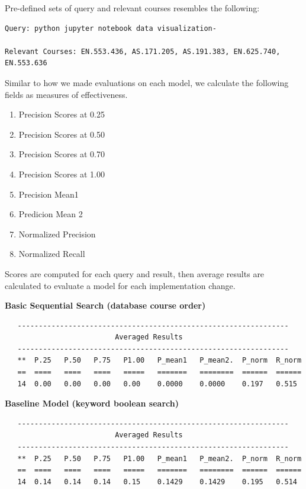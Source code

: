 \documentclass[twoside]{article}
\begin{document}
Pre-defined sets of query and relevant courses resembles the following:

\begin{verbatim}
Query: python jupyter notebook data visualization-

Relevant Courses: EN.553.436, AS.171.205, AS.191.383, EN.625.740, EN.553.636
\end{verbatim}

Similar to how we made evaluations on each model, we calculate the following fields as measures of effectiveness.

\begin{enumerate}
\item Precision Scores at 0.25
\item Precision Scores at 0.50
\item Precision Scores at 0.70
\item Precision Scores at 1.00
\item Precision Mean1
\item Predicion Mean 2
\item Normalized Precision
\item Normalized Recall
\end{enumerate}

Scores are computed for each query and result, then average results are calculated to evaluate a model for each implementation change.

\vfill

\textbf{Basic Sequential Search (database course order)}
\begin{verbatim}
   ----------------------------------------------------------------
                          Averaged Results
   ----------------------------------------------------------------
   **  P.25   P.50   P.75   P1.00   P_mean1   P_mean2.  P_norm  R_norm
   ==  ====   ====   ====   =====   =======   ========  ======  ======
   14  0.00   0.00   0.00   0.00    0.0000    0.0000    0.197   0.515
\end{verbatim}

\textbf{Baseline Model (keyword boolean search)}
\begin{verbatim}
   ----------------------------------------------------------------
                          Averaged Results
   ----------------------------------------------------------------
   **  P.25   P.50   P.75   P1.00   P_mean1   P_mean2.  P_norm  R_norm
   ==  ====   ====   ====   =====   =======   ========  ======  ======
   14  0.14   0.14   0.14   0.15    0.1429    0.1429    0.195   0.514
\end{verbatim}
\end{document}

